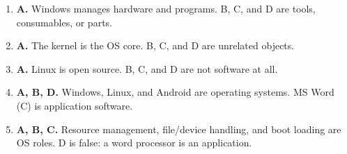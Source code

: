 \documentclass[11pt]{article}
\begin{document}
\begin{enumerate}[label=\textbf{Q\arabic*.}, leftmargin=*]
\item \textbf{A.} Windows manages hardware and programs. B, C, and D are tools, consumables, or parts.
\item \textbf{A.} The kernel is the OS core. B, C, and D are unrelated objects.
\item \textbf{A.} Linux is open source. B, C, and D are not software at all.
\item \textbf{A, B, D.} Windows, Linux, and Android are operating systems. MS Word (C) is application software.
\item \textbf{A, B, C.} Resource management, file/device handling, and boot loading are OS roles. D is false: a word processor is an application.
\end{enumerate}
\def\JKSSBLessonID{19}\def\JKSSBAnswers{1}
\end{document}
